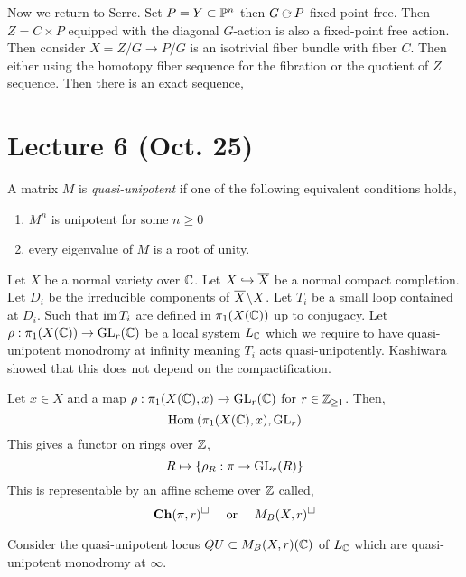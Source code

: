 \documentclass[12pt]{article}
\begin{document}
Now we return to Serre. Set $P = Y \subset \P^n$ then $G \acts P$ fixed point free. Then $Z  = C \times P$ equipped with the diagonal $G$-action is also a fixed-point free action. Then consider $X = Z / G \to P/G$ is an isotrivial fiber bundle with fiber $C$. Then either using the homotopy fiber sequence for the fibration or the quotient of $Z$ sequence. Then there is an exact sequence,
\begin{center}
\end{center}

\section{Lecture 6 (Oct. 25)}

\begin{defn}
A matrix $M$ is \textit{quasi-unipotent} if one of the following equivalent conditions holds,
\begin{enumerate}
\item $M^n$ is unipotent for some $n \ge 0$
\item every eigenvalue of $M$ is a root of unity.
\end{enumerate}
\end{defn}

Let $X$ be a normal variety over $\CC$. Let $X \embed \overline{X}$ be a normal compact completion. Let $D_i$ be the irreducible components of $\overline{X} \sm X$. Let $T_i$ be a small loop contained at $D_i$. Such that $\im{T_i}$ are defined in $\pi_1(X(\CC))$ up to conjugacy. Let $\rho : \pi_1(X(\CC)) \to \GL_r(\CC)$ be a local system $L_{\CC}$ which we require to have quasi-unipotent monodromy at infinity meaning $T_i$ acts quasi-unipotently. Kashiwara showed that this does not depend on the compactification.

\begin{defn}
Let $x \in X$ and a map $\rho : \pi_1(X(\CC), x) \to \GL_r(\CC)$ for $r \in \Z_{\ge 1}$. Then,
\[ \Hom{}{\pi_1(X(\CC), x)}{\GL_r} \]
This gives a functor on rings over $\ZZ$,
\[ R \mapsto \{ \rho_{R} : \pi \to \GL_r(R) \} \]
This is representable by an affine scheme over $\ZZ$ called,
\[ \Ch(\pi, r)^{\square} \quad \text{ or } \quad M_B(X, r)^{\square} \]
\end{defn}

\begin{defn}
Consider the quasi-unipotent locus $QU \subset M_B(X, r)(\CC)$ of $L_{\CC}$ which are quasi-unipotent monodromy at $\infty$.
\end{defn}
\end{document}
